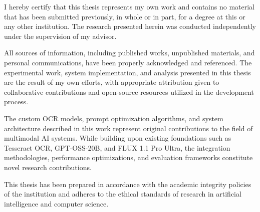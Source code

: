 
I hereby certify that this thesis represents my own work and contains no material that has been submitted previously, in whole or in part, for a degree at this or any other institution. The research presented herein was conducted independently under the supervision of my advisor.

All sources of information, including published works, unpublished materials, and personal communications, have been properly acknowledged and referenced. The experimental work, system implementation, and analysis presented in this thesis are the result of my own efforts, with appropriate attribution given to collaborative contributions and open-source resources utilized in the development process.

The custom OCR models, prompt optimization algorithms, and system architecture described in this work represent original contributions to the field of multimodal AI systems. While building upon existing foundations such as Tesseract OCR, GPT-OSS-20B, and FLUX 1.1 Pro Ultra, the integration methodologies, performance optimizations, and evaluation frameworks constitute novel research contributions.

This thesis has been prepared in accordance with the academic integrity policies of the institution and adheres to the ethical standards of research in artificial intelligence and computer science.